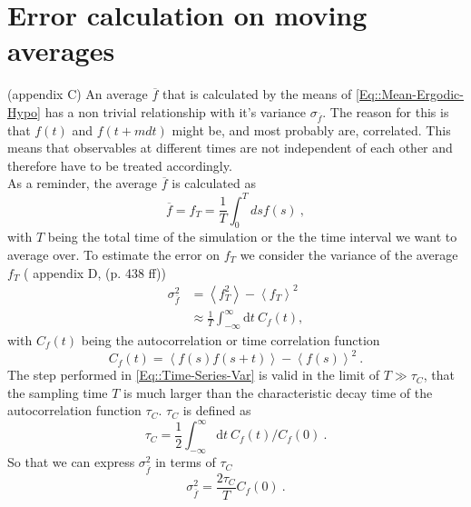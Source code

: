 	\section{Error calculation on moving averages} \label{Section::Error-Calc}
	\cite{madras1988pivot} (appendix C)
	An average $\overline{f}$ that is calculated by the means of \autoref{Eq::Mean-Ergodic-Hypo} has a non trivial relationship with it's variance $\sigma_{\overline{f}}$. The reason for this is that $f(t)$ and $f(t + mdt)$ might be, and most probably are, correlated. This means that observables at different times are not independent of each other and therefore have to be treated accordingly. \\
	
	As a reminder, the average $\overline{f}$ is calculated as
	\begin{equation}
		\overline{f} = f_T =	\frac{1}{T} \int_0^{T} ds f(s) ~,
	\end{equation}
	with $T$ being the total time of the simulation or the the time interval we want to average over. To estimate the error on $f_T$ we consider the variance of the average $f_T$ (\cite{frenkel2023understanding} appendix D, \cite{anderson2011statistical} (p. 438 ff))
	\begin{equation} \label{Eq::Time-Series-Var}
		\begin{split}
			\sigma_{\overline{f}}^2 &=	\left \langle f_T^2 \right \rangle - \left \langle f_T \right \rangle^2 \\
			&\approx \frac{1}{T} \int_{-\infty}^{\infty} \text{d}t~C_f(t),
		\end{split}
	\end{equation}
	with $C_f(t)$ being the autocorrelation or time correlation function
	\begin{equation} \label{Eq::Autorcorrlation-Time}
		C_f(t) =	\left \langle f(s) f(s + t) \right \rangle - \left \langle f(s) \right \rangle^2~.
	\end{equation}
	The step performed in \autoref{Eq::Time-Series-Var} is valid in the limit of $T \gg \tau_C$, that the sampling time $T$ is much larger than the characteristic decay time of the autocorrelation function $\tau_C$. $\tau_C$ is defined as
	\begin{equation}
		\tau_C = \frac{1}{2}	\int_{-\infty}^{\infty} \text{d}t~C_f(t) /	C_f(0)~.
	\end{equation}
	So that we can express $\sigma_{\overline{f}}^2$ in terms of $\tau_C$
	\begin{equation}
		\sigma_{\overline{f}}^2 =	\frac{2\tau_C}{T} C_f(0)~.
	\end{equation}
